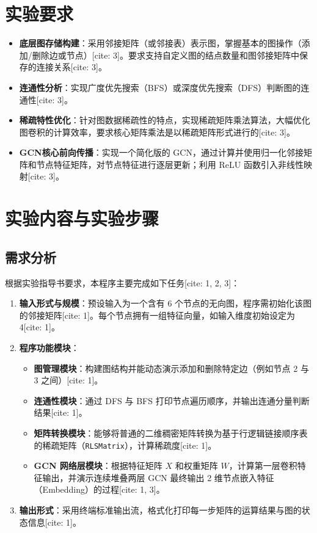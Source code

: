 \documentclass[12pt,a4paper]{article}
\begin{document}
\section{实验要求}
\begin{itemize}
    \item \textbf{底层图存储构建}：采用邻接矩阵（或邻接表）表示图，掌握基本的图操作（添加/删除边或节点）[cite: 3]。要求支持自定义图的结点数量和图邻接矩阵中保存的连接关系[cite: 3]。
    \item \textbf{连通性分析}：实现广度优先搜索（BFS）或深度优先搜索（DFS）判断图的连通性[cite: 3]。
    \item \textbf{稀疏特性优化}：针对图数据稀疏性的特点，实现稀疏矩阵乘法算法，大幅优化图卷积的计算效率，要求核心矩阵乘法是以稀疏矩阵形式进行的[cite: 3]。
    \item \textbf{GCN核心前向传播}：实现一个简化版的 GCN，通过计算并使用归一化邻接矩阵和节点特征矩阵，对节点特征进行逐层更新；利用 ReLU 函数引入非线性映射[cite: 3]。
\end{itemize}

\section{实验内容与实验步骤}

\subsection{需求分析}
根据实验指导书要求，本程序主要完成如下任务[cite: 1, 2, 3]：
\begin{enumerate}
    \item \textbf{输入形式与规模}：预设输入为一个含有 6 个节点的无向图，程序需初始化该图的邻接矩阵[cite: 1]。每个节点拥有一组特征向量，如输入维度初始设定为 4[cite: 1]。
    \item \textbf{程序功能模块}：
    \begin{itemize}
        \item \textbf{图管理模块}：构建图结构并能动态演示添加和删除特定边（例如节点 2 与 3 之间）[cite: 1]。
        \item \textbf{连通性模块}：通过 DFS 与 BFS 打印节点遍历顺序，并输出连通分量判断结果[cite: 1]。
        \item \textbf{矩阵转换模块}：能够将普通的二维稠密矩阵转换为基于行逻辑链接顺序表的稀疏矩阵（\texttt{RLSMatrix}），计算稀疏度[cite: 1]。
        \item \textbf{GCN 网络层模块}：根据特征矩阵 $X$ 和权重矩阵 $W$，计算第一层卷积特征输出，并演示连续堆叠两层 GCN 最终输出 2 维节点嵌入特征（Embedding）的过程[cite: 1, 3]。
    \end{itemize}
    \item \textbf{输出形式}：采用终端标准输出流，格式化打印每一步矩阵的运算结果与图的状态信息[cite: 1]。
\end{enumerate}
\end{document}
